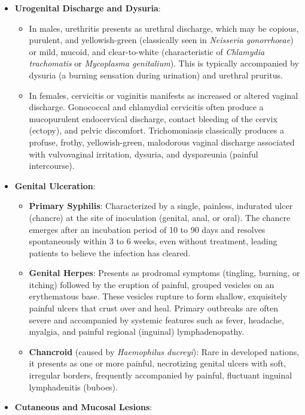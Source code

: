 \begin{itemize}
    \item \textbf{Urogenital Discharge and Dysuria}:
    \begin{itemize}
        \item In males, urethritis presents as urethral discharge, which may be copious, purulent, and yellowish-green (classically seen in \textit{Neisseria gonorrhoeae}) or mild, mucoid, and clear-to-white (characteristic of \textit{Chlamydia trachomatis} or \textit{Mycoplasma genitalium}). This is typically accompanied by dysuria (a burning sensation during urination) and urethral pruritus.
        \item In females, cervicitis or vaginitis manifests as increased or altered vaginal discharge. Gonococcal and chlamydial cervicitis often produce a mucopurulent endocervical discharge, contact bleeding of the cervix (ectopy), and pelvic discomfort. Trichomoniasis classically produces a profuse, frothy, yellowish-green, malodorous vaginal discharge associated with vulvovaginal irritation, dysuria, and dyspareunia (painful intercourse).
    \end{itemize}
    \item \textbf{Genital Ulceration}:
    \begin{itemize}
        \item \textbf{Primary Syphilis}: Characterized by a single, painless, indurated ulcer (chancre) at the site of inoculation (genital, anal, or oral). The chancre emerges after an incubation period of 10 to 90 days and resolves spontaneously within 3 to 6 weeks, even without treatment, leading patients to believe the infection has cleared.
        \item \textbf{Genital Herpes}: Presents as prodromal symptoms (tingling, burning, or itching) followed by the eruption of painful, grouped vesicles on an erythematous base. These vesicles rupture to form shallow, exquisitely painful ulcers that crust over and heal. Primary outbreaks are often severe and accompanied by systemic features such as fever, headache, myalgia, and painful regional (inguinal) lymphadenopathy.
        \item \textbf{Chancroid} (caused by \textit{Haemophilus ducreyi}): Rare in developed nations, it presents as one or more painful, necrotizing genital ulcers with soft, irregular borders, frequently accompanied by painful, fluctuant inguinal lymphadenitis (buboes).
    \end{itemize}
    \item \textbf{Cutaneous and Mucosal Lesions}:

\end{itemize}
